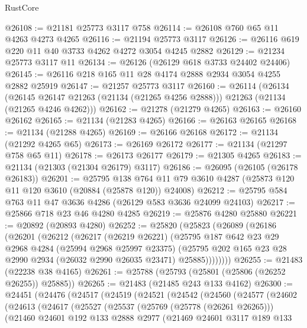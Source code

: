 \begin{lexlean}{RustCore}
\begin{coremodule}
@26108 := @21181 @25773 @3117 @758
@26114 := @26108 @760 @65 @11 @4263 @4273 @4265
@26116 := @21194 @25773 @3117
@26126 := @26116 @619 @220 @11 @40 @3733 @4262 @4272 @3054 @4245 @2882
@26129 := @21234 @25773 @3117 @11
@26134 := @26126 (@26129 @618 @3733 @24402 @24406)
@26145 := @26116 @218 @165 @11 @28 @4174 @2888 @2934 @3054 @4255 @2882 @25919
@26147 := @21257 @25773 @3117
@26160 := @26114
    (@26134
      (@26145 @26147 @21263 (@21134 (@21265 @4256 @2888)))
      @21263
      (@21134 (@21265 @4246 @4262)))
@26162 := @21278 (@21279 @4265)
@26163 := @26160 @26162
@26165 := @21134 (@21283 @4265)
@26166 := @26163 @26165
@26168 := @21134 (@21288 @4265)
@26169 := @26166 @26168
@26172 := @21134 (@21292 @4265 @65)
@26173 := @26169 @26172
@26177 := @21134 (@21297 @758 @65 @11)
@26178 := @26173 @26177
@26179 := @21305 @4265
@26183 := @21134 (@21303 (@21304 @26179) @3117)
@26186 := @26095 (@26105 (@26178 @26183))
@26201 := @25795
    @138
    @764
    @11
    @79
    @3610
    @4287
    (@25873 @120 @11 @120 @3610 (@20884 (@25878 @120)) @24008)
@26212 := @25795 @584 @763 @11 @47 @3636 @4286 (@26129 @583 @3636 @24099 @24103)
@26217 := @25866 @718 @23 @46 @4280 @4285
@26219 := @25876 @4280 @25880
@26221 := @20892 (@20893 @4280)
@26252 := @25820
    (@25823
      (@26089
        (@26186
          (@26201
            (@26212
              (@26217
                (@26219 @26221)
                (@25795
                  @187
                  @642
                  @23
                  @29
                  @2968
                  @4284
                  (@25994 @2968 @25997 @23375)
                  (@25795 @202 @165 @23 @28 @2990 @2934 (@26032 @2990 @26035 @23471) @25885))))))))
@26255 := @21483 (@22238 @38 @4165)
@26261 := @25788 (@25793 (@25801 (@25806 (@26252 @26255)) @25885))
@26265 := @21483 (@21485 @243 @133 @4162)
@26300 := @24451
    (@24476
      (@24517
        (@24519
          (@24521
            (@24542
              (@24560
                (@24577
                  (@24602
                    (@24613
                      (@24617
                        (@25527
                          (@25537
                            (@25769 (@25778 (@26261 @26265)))
                            (@21460
                              @24601
                              @192
                              @133
                              @2888
                              @2977
                              (@21469
                                @24601
                                @3117
                                @189
                                @133

\end{coremodule}
\end{lexlean}
